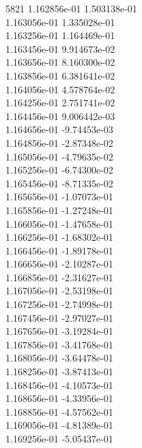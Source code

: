 5821	1.162856e-01	1.503138e-01	\\ 	1.163056e-01	1.335028e-01	\\ 	1.163256e-01	1.164469e-01	\\ 	1.163456e-01	9.914673e-02	\\ 	1.163656e-01	8.160300e-02	\\ 	1.163856e-01	6.381641e-02	\\ 	1.164056e-01	4.578764e-02	\\ 	1.164256e-01	2.751741e-02	\\ 	1.164456e-01	9.006442e-03	\\ 	1.164656e-01	-9.74453e-03	\\ 	1.164856e-01	-2.87348e-02	\\ 	1.165056e-01	-4.79635e-02	\\ 	1.165256e-01	-6.74300e-02	\\ 	1.165456e-01	-8.71335e-02	\\ 	1.165656e-01	-1.07073e-01	\\ 	1.165856e-01	-1.27248e-01	\\ 	1.166056e-01	-1.47658e-01	\\ 	1.166256e-01	-1.68302e-01	\\ 	1.166456e-01	-1.89178e-01	\\ 	1.166656e-01	-2.10287e-01	\\ 	1.166856e-01	-2.31627e-01	\\ 	1.167056e-01	-2.53198e-01	\\ 	1.167256e-01	-2.74998e-01	\\ 	1.167456e-01	-2.97027e-01	\\ 	1.167656e-01	-3.19284e-01	\\ 	1.167856e-01	-3.41768e-01	\\ 	1.168056e-01	-3.64478e-01	\\ 	1.168256e-01	-3.87413e-01	\\ 	1.168456e-01	-4.10573e-01	\\ 	1.168656e-01	-4.33956e-01	\\ 	1.168856e-01	-4.57562e-01	\\ 	1.169056e-01	-4.81389e-01	\\ 	1.169256e-01	-5.05437e-01	\\ \hline
